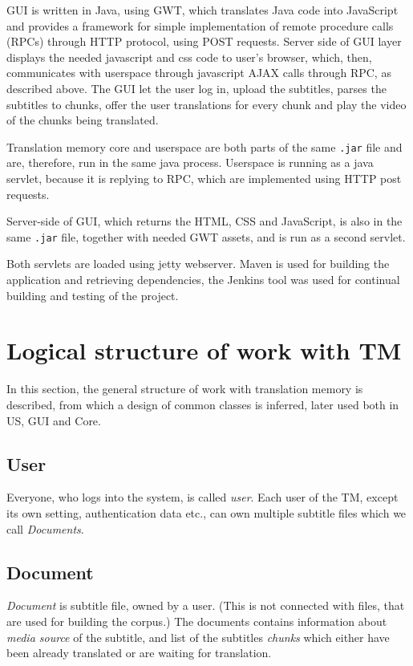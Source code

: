 GUI is written in Java, using GWT, which translates Java code into JavaScript and provides a framework for simple implementation of remote procedure calls (RPCs) through HTTP protocol, using POST requests. Server side of GUI layer displays the needed javascript and css code to user's browser, which, then, communicates with userspace through javascript AJAX calls through RPC, as described above. The GUI let the user log in, upload the subtitles, parses the subtitles to chunks, offer the user translations for every chunk and play the video of the chunks being translated.

Translation memory core and userspace are both parts of the same \texttt{.jar} file and are, therefore, run in the same java process. Userspace is running as a java servlet, because it is replying to RPC, which are implemented using HTTP post requests.

Server-side of GUI, which returns the HTML, CSS and JavaScript, is also in the same \texttt{.jar} file, together with needed GWT assets, and is run as a second servlet.

Both servlets are loaded using jetty webserver. Maven is used for building the application and retrieving dependencies, the Jenkins tool was used for continual building and testing of the project.

\section{Logical structure of work with TM}
\label{sec:shared_structure}

In this section, the general structure of work with translation memory is described, from which a design of common classes is inferred, later used both in US, GUI and Core.

\subsection*{User}
Everyone, who logs into the system, is called \emph{user}. Each user of the TM, except its own setting, authentication data etc., can own multiple subtitle files which we call \emph{Documents}.

\subsection*{Document}
\emph{Document} is subtitle file, owned by a user. (This is not connected with files, that are used for building the corpus.) The documents contains information about \emph{media source} of the subtitle, and list of the subtitles \emph{chunks} which either have been already translated or are waiting for translation.

